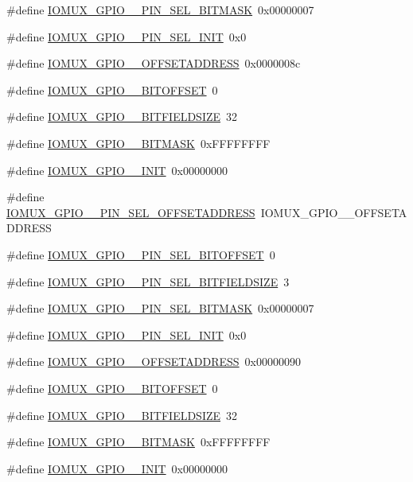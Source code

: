 \begin{DoxyCompactItemize}
\item 
\#define \hyperlink{a00560_a766046f5c93453940303c877a7d5bd50}{IOMUX\_\-GPIO\_\_\-PIN\_\-SEL\_\-BITMASK}~0x00000007
\item 
\#define \hyperlink{a00560_afd9696228891659e2815a3b1944c758c}{IOMUX\_\-GPIO\_\_\-PIN\_\-SEL\_\-INIT}~0x0
\item 
\#define \hyperlink{a00560_a1552feac4eb2618a11c9871d7914891b}{IOMUX\_\-GPIO\_\_\-OFFSETADDRESS}~0x0000008c
\item 
\#define \hyperlink{a00560_adb247de37f223c4bf67fe08e5d479445}{IOMUX\_\-GPIO\_\_\-BITOFFSET}~0
\item 
\#define \hyperlink{a00560_ae83ba63233660ed80669040865269c97}{IOMUX\_\-GPIO\_\_\-BITFIELDSIZE}~32
\item 
\#define \hyperlink{a00560_a9f211ea3a4a3a7ffb771aaa6c564396e}{IOMUX\_\-GPIO\_\_\-BITMASK}~0xFFFFFFFF
\item 
\#define \hyperlink{a00560_a78eb5efa54346ea4913a42927c621f39}{IOMUX\_\-GPIO\_\_\-INIT}~0x00000000
\item 
\#define \hyperlink{a00560_acd8b8d89ee8b377eea7690b77d203ee0}{IOMUX\_\-GPIO\_\_\-PIN\_\-SEL\_\-OFFSETADDRESS}~IOMUX\_\-GPIO\_\_\-OFFSETADDRESS
\item 
\#define \hyperlink{a00560_af994919130691b6c414c449c4a014bf3}{IOMUX\_\-GPIO\_\_\-PIN\_\-SEL\_\-BITOFFSET}~0
\item 
\#define \hyperlink{a00560_a298973ef2d38c6833beee2158f10b665}{IOMUX\_\-GPIO\_\_\-PIN\_\-SEL\_\-BITFIELDSIZE}~3
\item 
\#define \hyperlink{a00560_a8adfdb95630bbe9a866321d82733a094}{IOMUX\_\-GPIO\_\_\-PIN\_\-SEL\_\-BITMASK}~0x00000007
\item 
\#define \hyperlink{a00560_ab3ab54c7412ad7540eb2c60b1650950f}{IOMUX\_\-GPIO\_\_\-PIN\_\-SEL\_\-INIT}~0x0
\item 
\#define \hyperlink{a00560_ab4e1df48a4cb49a04356949f1fd8a8fc}{IOMUX\_\-GPIO\_\_\-OFFSETADDRESS}~0x00000090
\item 
\#define \hyperlink{a00560_aecabf1fd65b91b84ae701f617502179f}{IOMUX\_\-GPIO\_\_\-BITOFFSET}~0
\item 
\#define \hyperlink{a00560_a65a1e787cf6a54699a0a1aff3703d16b}{IOMUX\_\-GPIO\_\_\-BITFIELDSIZE}~32
\item 
\#define \hyperlink{a00560_aa99c9b684f147bb7b0af8570a1ec614d}{IOMUX\_\-GPIO\_\_\-BITMASK}~0xFFFFFFFF
\item 
\#define \hyperlink{a00560_ab84d178e6da5af774fe6f500eaa1cd13}{IOMUX\_\-GPIO\_\_\-INIT}~0x00000000

\end{DoxyCompactItemize}
